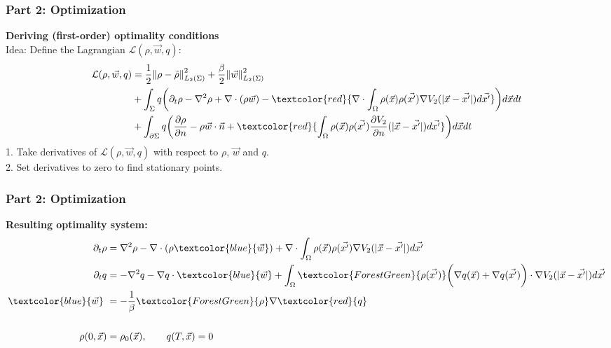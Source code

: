 \documentclass[aspectratio=169,xcolor=dvipsnames]{beamer}
\begin{document}
\begin{frame}
\frametitle{Part 2: Optimization}
\textbf{Deriving (first-order) optimality conditions}\\
Idea: Define the Lagrangian $\mathcal{L}(\rho, \vec{w}, q)$:
\begin{align*}
\mathcal{L}(\rho, \vec{w},q)&= \frac{1}{2}\norm{\rho- \hat{\rho}}_{L_2(\Sigma)}^2 + \frac{\beta}{2} \norm{\vec{w}}_{L_2(\Sigma)}^2\\
&+ \int_\Sigma q \bigg( \partial_t \rho - \nabla^2 \rho + \nabla \cdot (\rho \vec{w})
-\textcolor{red}{ \nabla \cdot\int_\Omega \rho(\vec{x}) \rho(\vec{x'}) \nabla V_2(|\vec{x}-\vec{x'}|)d\vec{x'}}    \bigg) d\vec{x} dt\\
&+ \int_{\partial \Sigma} q \bigg(\frac{\partial \rho}{\partial n} - \rho \vec{w} \cdot \vec{n} +\textcolor{red}{ \int_\Omega \rho(\vec{x}) \rho(\vec{x'})  \frac{ \partial  V_2}{\partial n}(|\vec{x}-\vec{x'}|)d\vec{x'}} \bigg) d\vec{x} dt\\
\end{align*}
1. Take derivatives of $\mathcal{L}(\rho, \vec{w}, q)$ with respect to $\rho$, $\vec{w}$ and $q$. \\
2. Set derivatives to zero to find stationary points. \\
\end{frame}
\begin{frame}
	\frametitle{Part 2: Optimization}
	\textbf{Resulting optimality system:}\\
     
	\begin{align*}
	 \partial_t \rho &= \nabla^2 \rho - \nabla \cdot (\rho \textcolor{blue}{\vec{w}})
	+ \nabla \cdot \int_\Omega \rho(\vec{x}) \rho(\vec{x'}) \nabla V_2(|\vec{x}-\vec{x'}|)d\vec{x'}  \\
	\partial_t q &= -\nabla^2 q - \nabla q \cdot \textcolor{blue}{\vec{w}} + \int_\Omega \textcolor{ForestGreen}{\rho(\vec{x'})} \bigg(\nabla q(\vec{x}) + \nabla q(\vec{x'})\bigg)\cdot  \nabla V_2(|\vec{x}-\vec{x'}|)d\vec{x'} \\
    \textcolor{blue}{\vec{w}} \ &= - \frac{1}{\beta}\textcolor{ForestGreen}{\rho} \nabla  \textcolor{red}{q}\\
    \\
    \rho(0,\vec{x})&=\rho_0(\vec{x}), \qquad q(T,\vec{x})= 0 \\
	\end{align*}
\end{frame}
\end{document}
